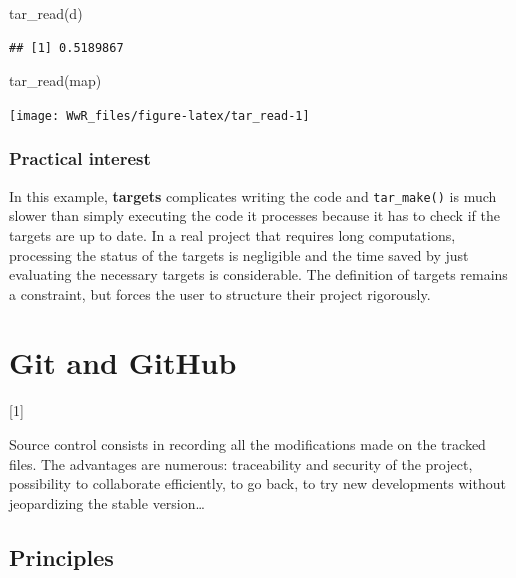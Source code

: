 \documentclass[
  12pt,
  american,
  a4paper,
  extrafontsizes,onecolumn,openright
  ]{memoir}
\newenvironment{Shaded}{\begin{snugshade}}{\end{snugshade}}
\newcommand{\FunctionTok}[1]{\textcolor[rgb]{0.00,0.00,0.00}{#1}}
\newcommand{\NormalTok}[1]{#1}
\newcommand{\toc}[1]{%
  \startcontents[chapters]%
  \printcontents[chapters]{}{1}[#1]{}%
  ~\newline%
}
\begin{document}
\scriptsize

\begin{Shaded}
\begin{Highlighting}[]
\FunctionTok{tar\_read}\NormalTok{(d)}
\end{Highlighting}
\end{Shaded}

\begin{verbatim}
## [1] 0.5189867
\end{verbatim}

\begin{Shaded}
\begin{Highlighting}[]
\FunctionTok{tar\_read}\NormalTok{(map)}
\end{Highlighting}
\end{Shaded}

\begin{center}\texttt{[image: WwR\_files/figure-latex/tar\_read-1]} \end{center}

\normalsize

\hypertarget{practical-interest}{%
\subsection{Practical interest}\label{practical-interest}}

In this example, \textbf{targets} complicates writing the code and \texttt{tar\_make()} is much slower than simply executing the code it processes because it has to check if the targets are up to date.
In a real project that requires long computations, processing the status of the targets is negligible and the time saved by just evaluating the necessary targets is considerable.
The definition of targets remains a constraint, but forces the user to structure their project rigorously.

\hypertarget{chap-git}{%
\chapter{Git and GitHub}\label{chap-git}}

\toc{1}

Source control consists in recording all the modifications made on the tracked files.
The advantages are numerous: traceability and security of the project, possibility to collaborate efficiently, to go back, to try new developments without jeopardizing the stable version\ldots{}

\hypertarget{sec:principes-git}{%
\section{Principles}\label{sec:principes-git}}
\end{document}
